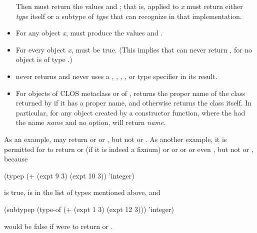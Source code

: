\begin{defun}[Function]
\begin{new}
\begin{itemize}
Then
must return the values  and ; that is,  applied
to {\it x} must return either {\it type} itself or a subtype of {\it type}
that  can recognize in that implementation.

\item
For any object {\it x}, 
must produce the values  and .

\item
For every object {\it x}, 
must be true.  (This implies that  can never return ,
for no object is of type .)

\item
{} never returns  and never uses
a , , , ,
or  type specifier in its result.

\item
For objects of CLOS metaclass  or of ,
 returns the proper name of the class returned by 
if it has a proper name, and otherwise returns the class itself.
In particular,
for any object created by a  constructor function,
where the  had the name {\it name} and no  option,
 will return {\it name}.
\end{itemize}

As an example, 
may return  or  or ,
but not  or .
As another example, it is permitted for
 to return
 or  (if it is indeed a fixnum) or
 or  or 
or even , but not  or , because
\begin{lisp}
(typep (+ (expt 9 3) (expt 10 3)) 'integer)
\end{lisp}
is true,  is in the list of types mentioned above, and
\begin{lisp}
(subtypep (type-of (+ (expt 1 3) (expt 12 3))) 'integer)
\end{lisp}
would be false if  were to return  or .
\end{new}
\end{defun}



